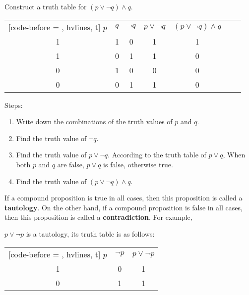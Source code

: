 \documentclass{report}
\newcounter{example}
\begin{document}
\vspace{0.5cm}
\begin{example}
    \item Construct a truth table for $(p \lor \neg q) \land q$.
\end{example}
\begin{solution}
    \item
    \begin{NiceTabular}{|c|c|c|c|c|c|c|}[code-before = , hvlines, t]
        $p$ & $q$ & $\neg q$ & $p \lor \neg q$ & $(p \lor \neg q) \land q$ \\
        1   & 1   & 0        & 1               & 1                         \\
        1   & 0   & 1        & 1               & 0                         \\
        0   & 1   & 0        & 0               & 0                         \\
        0   & 0   & 1        & 1               & 0                         \\
    \end{NiceTabular}
\end{solution}

Steps:
\begin{enumerate}[leftmargin=*, label=\indent(\arabic*)]
    \item Write down the combinations of the truth values of $p$ and $q$.
    \item Find the truth value of $\neg q$.
    \item Find the truth value of $p \lor \neg q$. According to the truth table of $p
              \lor q$, When both $p$ and $q$ are false, $p \lor q$ is false, otherwise true.
    \item Find the truth value of $(p \lor \neg q) \land q$.
\end{enumerate}

If a compound proposition is true in all cases, then this proposition is called
a \textbf{tautology}. On the other hand, if a compound proposition is false in
all cases, then this proposition is called a \textbf{contradiction}. For
example,

$p \lor \neg p$ is a tautology, its truth table is as follows:
\begin{center}
    \begin{NiceTabular}{|c|c|c|}[code-before = , hvlines, t]
        $p$ & $\neg p$ & $p \lor \neg p$ \\
        1   & 0        & 1               \\
        0   & 1        & 1               \\
    \end{NiceTabular}
\end{center}
\end{document}
